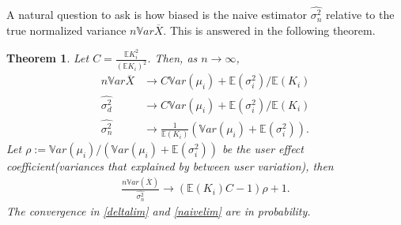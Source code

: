 \documentclass[11pt]{asaproc}
\newcommand{\wht}{\widehat}
\newcommand{\var}{\ensuremath{\mathbb Var}}
\newcommand{\bbe}{\mathbb{E}}
\newcommand{\xbar}{\overline{X}}
\newcommand{\naiveest}{\wht{\sigma^2_n}}
\newcommand{\deltaest}{\wht{\sigma^2_d}}
\newtheorem{thm}{Theorem}
\begin{document}
A natural question to ask is how biased is the naive estimator $\naiveest$ relative to the true normalized variance $n\var \xbar$. This is answered in the following theorem.
\begin{thm}\label{thm1.1}
Let $C = \frac{\bbe K_i^2}{(\bbe K_i)^2}$.  Then, as $n\to \infty$,
\begin{align}
n\var\xbar &\to C \var(\mu_i) + \bbe(\sigma^2_i)/\bbe (K_i)\label{truevar} \\
\deltaest & \to  C \var(\mu_i) + \bbe(\sigma^2_i)/\bbe (K_i)\label{deltalim}  \\
\naiveest & \to  \frac{1}{\bbe(K_i)} (\var(\mu_i)+\bbe(\sigma_i^2))\label{naivelim}.
\end{align}
Let $\rho:= \var(\mu_i)/(\var(\mu_i)+\bbe(\sigma^2_i))$ be the user effect coefficient(variances that explained by between user variation), then
\begin{align}
\frac{n\var (\xbar)}{\naiveest} \to  (\bbe(K_i)C - 1)\rho +1.
\end{align}
The convergence in \eqref{deltalim} and \eqref{naivelim} are  in probability. 
\end{thm}
\end{document}
